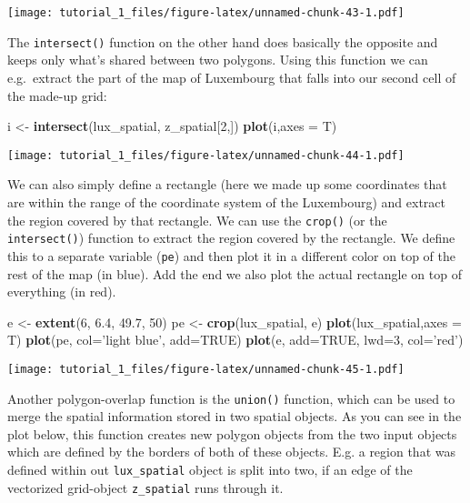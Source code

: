\documentclass[]{article}
\newenvironment{Shaded}{\begin{snugshade}}{\end{snugshade}}
\newcommand{\DataTypeTok}[1]{\textcolor[rgb]{0.13,0.29,0.53}{#1}}
\newcommand{\DecValTok}[1]{\textcolor[rgb]{0.00,0.00,0.81}{#1}}
\newcommand{\FloatTok}[1]{\textcolor[rgb]{0.00,0.00,0.81}{#1}}
\newcommand{\KeywordTok}[1]{\textcolor[rgb]{0.13,0.29,0.53}{\textbf{#1}}}
\newcommand{\NormalTok}[1]{#1}
\newcommand{\OtherTok}[1]{\textcolor[rgb]{0.56,0.35,0.01}{#1}}
\newcommand{\StringTok}[1]{\textcolor[rgb]{0.31,0.60,0.02}{#1}}
\begin{document}
\texttt{[image: tutorial\_1\_files/figure-latex/unnamed-chunk-43-1.pdf]}

The \texttt{intersect()} function on the other hand does basically the
opposite and keeps only what's shared between two polygons. Using this
function we can e.g.~extract the part of the map of Luxembourg that
falls into our second cell of the made-up grid:

\begin{Shaded}
\begin{Highlighting}[]
\NormalTok{i <-}\StringTok{ }\KeywordTok{intersect}\NormalTok{(lux_spatial, z_spatial[}\DecValTok{2}\NormalTok{,])}
\KeywordTok{plot}\NormalTok{(i,}\DataTypeTok{axes =}\NormalTok{ T)}
\end{Highlighting}
\end{Shaded}

\texttt{[image: tutorial\_1\_files/figure-latex/unnamed-chunk-44-1.pdf]}

We can also simply define a rectangle (here we made up some coordinates
that are within the range of the coordinate system of the Luxembourg)
and extract the region covered by that rectangle. We can use the
\texttt{crop()} (or the \texttt{intersect()}) function to extract the
region covered by the rectangle. We define this to a separate variable
(\texttt{pe}) and then plot it in a different color on top of the rest
of the map (in blue). Add the end we also plot the actual rectangle on
top of everything (in red).

\begin{Shaded}
\begin{Highlighting}[]
\NormalTok{e <-}\StringTok{ }\KeywordTok{extent}\NormalTok{(}\DecValTok{6}\NormalTok{, }\FloatTok{6.4}\NormalTok{, }\FloatTok{49.7}\NormalTok{, }\DecValTok{50}\NormalTok{)}
\NormalTok{pe <-}\StringTok{ }\KeywordTok{crop}\NormalTok{(lux_spatial, e)}
\KeywordTok{plot}\NormalTok{(lux_spatial,}\DataTypeTok{axes =}\NormalTok{ T)}
\KeywordTok{plot}\NormalTok{(pe, }\DataTypeTok{col=}\StringTok{'light blue'}\NormalTok{, }\DataTypeTok{add=}\OtherTok{TRUE}\NormalTok{)}
\KeywordTok{plot}\NormalTok{(e, }\DataTypeTok{add=}\OtherTok{TRUE}\NormalTok{, }\DataTypeTok{lwd=}\DecValTok{3}\NormalTok{, }\DataTypeTok{col=}\StringTok{'red'}\NormalTok{)}
\end{Highlighting}
\end{Shaded}

\texttt{[image: tutorial\_1\_files/figure-latex/unnamed-chunk-45-1.pdf]}

Another polygon-overlap function is the \texttt{union()} function, which
can be used to merge the spatial information stored in two spatial
objects. As you can see in the plot below, this function creates new
polygon objects from the two input objects which are defined by the
borders of both of these objects. E.g. a region that was defined within
out \texttt{lux\_spatial} object is split into two, if an edge of the
vectorized grid-object \texttt{z\_spatial} runs through it.
\end{document}
